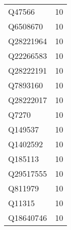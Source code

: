 \begin{tabular}{lr}
      Q47566 &     10 \\
    Q6508670 &     10 \\
   Q28221964 &     10 \\
   Q22266583 &     10 \\
   Q28222191 &     10 \\
    Q7893160 &     10 \\
   Q28222017 &     10 \\
       Q7270 &     10 \\
     Q149537 &     10 \\
    Q1402592 &     10 \\
     Q185113 &     10 \\
   Q29517555 &     10 \\
     Q811979 &     10 \\
      Q11315 &     10 \\
   Q18640746 &     10 \\
\bottomrule
\end{tabular}
